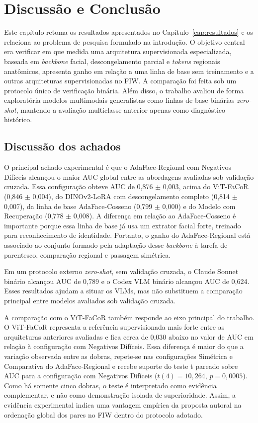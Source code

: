 \chapter[Discussão e Conclusão]{Discussão e Conclusão}
\label{cap:conclusao}

Este capítulo retoma os resultados apresentados no Capítulo~\ref{cap:resultados} e os relaciona ao problema de pesquisa formulado na introdução. O objetivo central era verificar em que medida uma arquitetura supervisionada especializada, baseada em \textit{backbone} facial, descongelamento parcial e \textit{tokens} regionais anatômicos, apresenta ganho em relação a uma linha de base sem treinamento e a outras arquiteturas supervisionadas no FIW. A comparação foi feita sob um protocolo único de verificação binária. Além disso, o trabalho avaliou de forma exploratória modelos multimodais generalistas como linhas de base binárias \textit{zero-shot}, mantendo a avaliação multiclasse anterior apenas como diagnóstico histórico.

\section{Discussão dos achados}

O principal achado experimental é que o AdaFace-Regional com Negativos Difíceis alcançou o maior AUC global entre as abordagens avaliadas sob validação cruzada. Essa configuração obteve AUC de 0,876 $\pm$ 0,003, acima do ViT-FaCoR (0,846 $\pm$ 0,004), do DINOv2-LoRA com descongelamento completo (0,814 $\pm$ 0,007), da linha de base AdaFace-Cosseno (0,799 $\pm$ 0,000) e do Modelo com Recuperação (0,778 $\pm$ 0,008). A diferença em relação ao AdaFace-Cosseno é importante porque essa linha de base já usa um extrator facial forte, treinado para reconhecimento de identidade. Portanto, o ganho do AdaFace-Regional está associado ao conjunto formado pela adaptação desse \textit{backbone} à tarefa de parentesco, comparação regional e passagem simétrica.

Em um protocolo externo \textit{zero-shot}, sem validação cruzada, o Claude Sonnet binário alcançou AUC de 0,789 e o Codex VLM binário alcançou AUC de 0,624. Esses resultados ajudam a situar os VLMs, mas não substituem a comparação principal entre modelos avaliados sob validação cruzada.

A comparação com o ViT-FaCoR também responde ao eixo principal do trabalho. O ViT-FaCoR representa a referência supervisionada mais forte entre as arquiteturas anteriores avaliadas e fica cerca de 0,030 abaixo no valor de AUC em relação à configuração com Negativos Difíceis. Essa diferença é maior do que a variação observada entre as dobras, repete-se nas configurações Simétrica e Comparativa do AdaFace-Regional e recebe suporte do teste t pareado sobre AUC para a configuração com Negativos Difíceis ($t(4)=10{,}264$, $p=0{,}0005$). Como há somente cinco dobras, o teste é interpretado como evidência complementar, e não como demonstração isolada de superioridade. Assim, a evidência experimental indica uma vantagem empírica da proposta autoral na ordenação global dos pares no FIW dentro do protocolo adotado.

